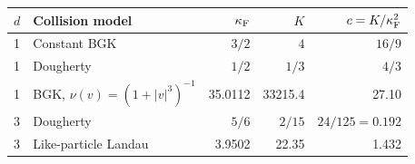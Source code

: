 \begin{tabular}{llrrr}\toprule
$d$ & Collision model & $\kappa_{\mathrm F}$ & $K$ & $c=K/\kappa_{\mathrm F}^2$\\\midrule
1 & Constant BGK & $3/2$ & $4$ & $16/9$\\
1 & Dougherty & $1/2$ & $1/3$ & $4/3$\\
1 & BGK, $\nu(v)=(1+|v|^3)^{-1}$ & 35.0112 & 33215.4 & 27.10 \\
\midrule 3 & Dougherty & $5/6$ & $2/15$ & $24/125=0.192$\\
3 & Like-particle Landau & 3.9502 & 22.35 & 1.432 \\
\bottomrule\end{tabular}
